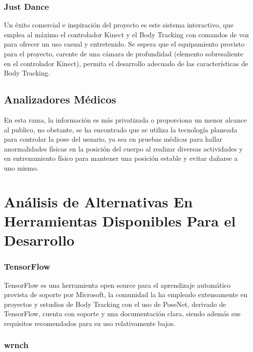 \subsubsection{Just Dance}

Un éxito comercial e inspiración del proyecto es este sistema interactivo, que emplea al máximo el controlador Kinect y el Body Tracking con comandos de voz para ofrecer un uso casual y entretenido. Se espera que el equipamiento provisto para el proyecto, carente de una cámara de profundidad (elemento sobresaliente en el controlador Kinect), permita el desarrollo adecuado de las características de Body Tracking.

\subsection{Analizadores Médicos}

En esta rama, la información es más privatizada o proporciona un menor alcance al publico, no obstante, se ha encontrado que se utiliza la tecnología planeada para controlar la pose del usuario, ya sea en pruebas médicas para hallar anormalidades físicas en la posición del cuerpo al realizar diversas actividades y en entrenamiento físico para mantener una posición estable y evitar dañarse a uno mismo.

\section{Análisis de Alternativas En Herramientas Disponibles Para el Desarrollo}


\subsubsection{TensorFlow}

TensorFlow es una herramienta open source para el aprendizaje automático provista de soporte por Microsoft, la comunidad la ha empleado extensamente en proyectos y estudios de Body Tracking con el uso de PoseNet, derivado de TensorFlow, cuenta con soporte y una documentación clara, siendo además sus requisitos recomendados para su uso relativamente bajos.

\subsubsection{wrnch}

